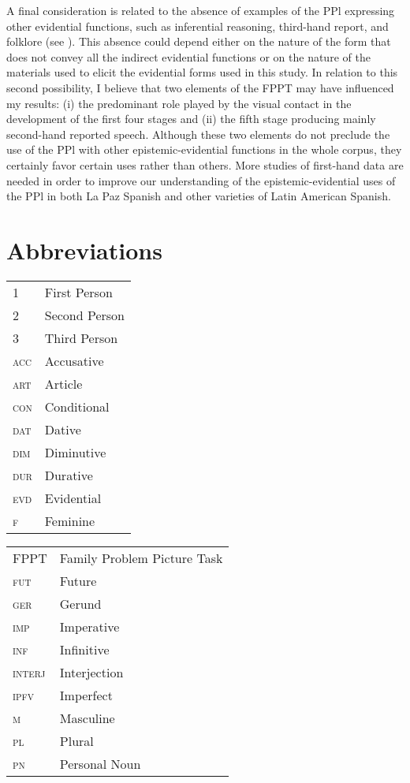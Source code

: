 \documentclass[output=paper]{langsci/langscibook}
\begin{document}
 A final consideration is related to the absence of examples of the PPl expressing other evidential functions, such as inferential reasoning, third-hand report, and folklore (see \citealt{Aikhenvald2004}). This absence could depend either on the nature of the form that does not convey all the indirect evidential functions or on the nature of the materials used to elicit the evidential forms used in this study. In relation to this second possibility, I believe that two elements of the FPPT may have influenced my results: (i) the predominant role played by the visual contact in the development of the first four stages and (ii) the fifth stage producing mainly second-hand reported speech. Although these two elements do not preclude the use of the PPl with other epistemic-evidential functions in the whole corpus, they certainly favor certain uses rather than others. More studies of first-hand data are needed in order to improve our understanding of the epistemic-evidential uses of the PPl in both La Paz Spanish and other varieties of Latin American Spanish. 


\section*{Abbreviations}

\begin{tabularx}{.55\textwidth}{lQ}
1 & First Person\\ 
2 & Second Person\\ 
3 & Third Person\\ 
\textsc{acc} & Accusative\\ 
\textsc{art} & Article\\ 
\textsc{con} & Conditional\\ 
\textsc{dat} & Dative\\
\textsc{dim} & Diminutive\\ 
\textsc{dur} & Durative\\ 
\textsc{evd} & Evidential\\ 
\textsc{f} & Feminine\\
\end{tabularx}%
\begin{tabularx}{.44\textwidth}{lQ}
FPPT & Family Problem Picture Task\\
\textsc{fut} & Future\\
\textsc{ger} & Gerund\\
\textsc{imp} & Imperative\\
\textsc{inf} & Infinitive\\ 
\textsc{interj} & Interjection\\ 
\textsc{ipfv} & Imperfect\\ 
\textsc{m} & Masculine\\ 
\textsc{pl} & Plural\\ 
\textsc{pn} & Personal Noun\\ 
\end{tabularx}%
\end{document}
